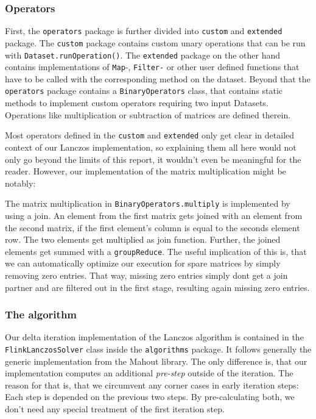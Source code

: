 \subsubsection{Operators}

First, the \texttt{operators} package is further divided into \texttt{custom} and \texttt{extended} package. The \texttt{custom} package contains custom unary operations that can be run with \texttt{Dataset.runOperation()}. The \texttt{extended} package on the other hand contains implementations of \texttt{Map}-, \texttt{Filter-} or other user defined functions that have to be called with the corresponding method on the dataset. Beyond that the \texttt{operators} package contains a \texttt{BinaryOperators} class, that contains static methods to implement custom operators requiring two input Datasets. Operations like multiplication or subtraction of matrices are defined therein.

Most operators defined in the \texttt{custom} and \texttt{extended} only get clear in detailed context of our Lanczos implementation, so explaining them all here would not only go beyond the limits of this report, it wouldn't even be meaningful for the reader. However, our implementation of the matrix multiplication might be notably:

The matrix multiplication in \texttt{BinaryOperators.multiply} is implemented by using a join. An element from the first matrix gets joined with an element from the second matrix, if the first element's column is equal to the seconds element row. The two elements get multiplied as join function. Further, the joined elements get summed with a \texttt{groupReduce}. The useful implication of this is, that we can automatically optimize our execution for spare matrices by simply removing zero entries. That way, missing zero entries simply dont get a join partner and are filtered out in the first stage, resulting again missing zero entries.

\subsubsection{The algorithm}

Our delta iteration implementation of the Lanczos algorithm is contained in the \texttt{FlinkLanczosSolver} class inside the \texttt{algorithms} package. It follows generally the generic implementation from the Mahout library. The only difference is, that our implementation computes an additional \textit{pre-step} outside of the iteration. The reason for that is, that we circumvent any corner cases in early iteration steps: Each step is depended on the previous two steps. By pre-calculating both, we don't need any special treatment of the first iteration step.

